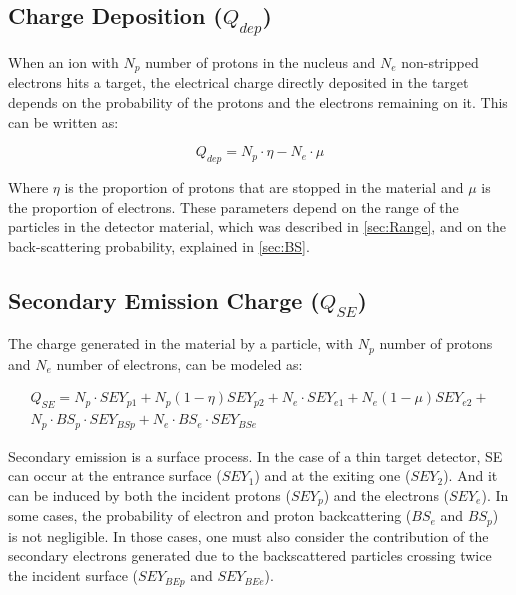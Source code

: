 \subsection{Charge Deposition ($Q_{dep}$)}

When an ion with $N_p$ number of protons in the nucleus and $N_e$ non-stripped electrons hits a target, the electrical charge directly deposited in the target depends on the probability of the protons and the electrons remaining on it. This can be written as: 

\begin{equation}
    Q_{dep} = N_p \cdot \eta - N_{e}\cdot \mu
\end{equation}

Where $\eta$ is the proportion of protons that are stopped in the material and $\mu$ is the proportion of electrons. These parameters depend on the range of the particles in the detector material, which was described in \ref{sec:Range}, and on the back-scattering probability, explained in \ref{sec:BS}. 

\subsection{Secondary Emission Charge ($Q_{SE}$)} 

The charge generated in the material by a particle, with $N_p$ number of protons and $N_e$ number of electrons, can be modeled as: 

\begin{equation}
    \begin{split}
        Q_{SE} = N_p \cdot SEY_{p1} + N_p \left(1-\eta\right)SEY_{p2} + 
                N_e \cdot SEY_{e1} + N_e \left( 1 - \mu \right) SEY_{e2} + \\
                N_p \cdot BS_p \cdot SEY_{BSp} + N_e \cdot BS_e \cdot SEY_{BSe}
    \end{split}
    \label{eq:Qse}
\end{equation}

Secondary emission is a surface process. In the case of a thin target detector, SE can occur at the entrance surface ($SEY_1$) and at the exiting one ($SEY_2$). And it can be induced by both the incident protons ($SEY_p$) and the electrons ($SEY_e$). In some cases, the probability of electron and proton backcattering ($BS_e$ and $BS_p$) is not negligible. In those cases, one must also consider the contribution of the secondary electrons generated due to the backscattered particles crossing twice the incident surface ($SEY_{BEp}$ and $SEY_{BEe}$).

